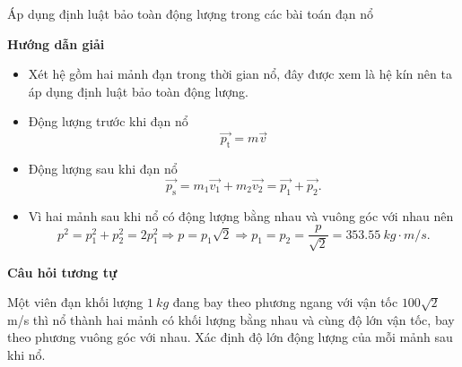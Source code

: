 \begin{dang}{Áp dụng định luật bảo toàn động lượng trong các bài toán đạn nổ}
	{\begin{center}
			\textbf{Hướng dẫn giải}
		\end{center}
		
		\begin{itemize}
			\item Xét hệ gồm hai mảnh đạn trong thời gian nổ, đây được xem là hệ kín nên ta áp dụng định luật bảo toàn động lượng.
			\item Động lượng trước khi đạn nổ
			\begin{equation*}
			\vec{p_{\text{t}}}=m\vec{v}
			\end{equation*}
			\item Động lượng sau khi đạn nổ
			\begin{equation*}
				\vec{p_{\text{s}}}=m_1\vec{v_1}+m_2 \vec{v_2} =\vec{p_1} + \vec{p_2}. 
			\end{equation*}
			\item Vì hai mảnh sau khi nổ có động lượng bằng nhau và vuông góc với nhau nên
			\begin{equation*}
				p^2= p_1^2 + p_2^2 = 2p_1^2 \Rightarrow p = p_1 \sqrt{2} \Rightarrow p_1=p_2=\dfrac{p}{\sqrt{2}}=\SI{353.55}{kg \cdot m/s}.
			\end{equation*}
			
		\end{itemize}
		
		\begin{center}
			\textbf{Câu hỏi tương tự}
		\end{center}
		
		Một viên đạn khối lượng $\SI{1}{kg}$ đang bay theo phương ngang với vận tốc $100\sqrt 2$ m/s thì nổ thành hai mảnh có khối lượng bằng nhau và cùng độ lớn vận tốc, bay theo phương vuông góc với nhau. Xác định độ lớn động lượng của mỗi mảnh sau khi nổ.
		
}
\end{dang}
